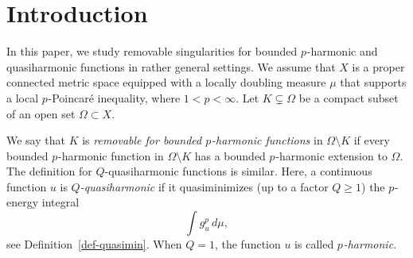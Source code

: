 \documentclass[a4paper,twoside]{article}
\theoremstyle{propositional}
\theoremstyle{descriptive}
\theoremstyle{remarkstyle}
\newcommand{\setm}{\setminus}
\renewcommand{\subsetneq}{\varsubsetneq}
\newcommand{\Om}{\Omega}
\newcommand{\p}{{$p\mspace{1mu}$}}
\numberwithin{equation}{section}
\begin{document}
\medskip
{}

\medskip






\section{Introduction}


In this paper, we study removable singularities 
for bounded \p-harmonic and quasiharmonic functions
in rather general settings.
We assume that  $X$ is a proper connected metric space
equipped with a locally doubling measure $\mu$ that
supports a local \p-Poincar\'e inequality, where $1<p<\infty$.
Let $K \subsetneq \Om$ be a compact subset of an open set $\Om\subset X$.


We say that $K$ is \emph{removable for bounded \p-harmonic 
functions} in $\Om \setm K$
if  every bounded \p-harmonic function in $\Om \setm K$
has a bounded \p-harmonic  extension  to $\Om$.
The definition for $Q$-quasiharmonic functions is similar.
Here, a continuous function $u$ is \emph{$Q$-quasiharmonic}
if it quasiminimizes (up to a factor $Q \ge 1$)
the \p-energy integral 
\[ 
      \int g^p_u \, d\mu,
\] 
see Definition~\ref{def-quasimin}.
When $Q=1$, the function $u$ is called \emph{\p-harmonic}.
\end{document}
